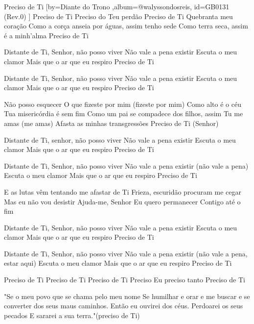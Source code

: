 \beginsong
{Preciso de Ti %
}[by={Diante do Trono %
},album={@walyssondosreis},
id={GB0131 %
(Rev.0) %
}]
Preciso de Ti
Preciso do Teu perdão
Preciso de Ti
Quebranta meu coração
Como a corça anseia por águas, assim tenho sede
Como terra seca, assim é a minh'alma
Preciso de Ti

Distante de Ti, Senhor, não posso viver
Não vale a pena existir
Escuta o meu clamor
Mais que o ar que eu respiro
Preciso de Ti

Distante de Ti, Senhor, não posso viver
Não vale a pena existir
Escuta o meu clamor
Mais que o ar que eu respiro
Preciso de Ti

Não posso esquecer
O que fizeste por mim (fizeste por mim)
Como alto é o céu
Tua misericórdia é sem fim
Como um pai se compadece dos filhos, assim Tu me amas (me amas)
Afasta as minhas transgressões
Preciso de Ti (Senhor)

Distante de Ti, senhor, não posso viver
Não vale a pena existir
Escuta o meu clamor
Mais que o ar que eu respiro
Preciso de Ti

Distante de Ti, Senhor, não posso viver
Não vale a pena existir (não vale a pena)
Escuta o meu clamor
Mais que o ar que eu respiro
Preciso de Ti

E as lutas vêm tentando me afastar de Ti
Frieza, escuridão procuram me cegar
Mas eu não vou desistir
Ajuda-me, Senhor
Eu quero permanecer Contigo até o fim

Distante de Ti, Senhor, não posso viver
Não vale a pena existir
Escuta o meu clamor
Mais que o ar que eu respiro
Preciso de Ti

Distante de Ti, Senhor, não posso viver
Não vale a pena existir (não vale a pena, estar aqui)
Escuta o meu clamor
Mais que o ar que eu respiro
Preciso de Ti

Preciso de Ti
Preciso de Ti
Preciso de Ti
Preciso
Eu preciso tanto
Preciso de Ti

"Se o meu povo que se chama pelo meu nome
Se humilhar e orar e me buscar e se converter dos seus maus caminhos.
Então eu ouvirei dos céus. Perdoarei os seus pecados
E sararei a sua terra."(preciso de Ti)

